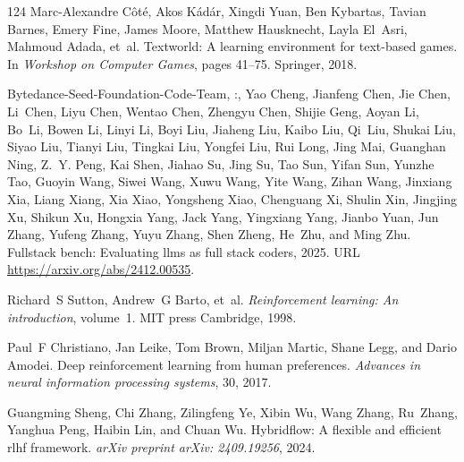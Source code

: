 \documentclass[]{youtu} %
\begin{document}
\begin{thebibliography}{124}
Marc-Alexandre C{\^o}t{\'e}, Akos K{\'a}d{\'a}r, Xingdi Yuan, Ben Kybartas, Tavian Barnes, Emery Fine, James Moore, Matthew Hausknecht, Layla El~Asri, Mahmoud Adada, et~al.
\newblock Textworld: A learning environment for text-based games.
\newblock In \emph{Workshop on Computer Games}, pages 41--75. Springer, 2018.

Bytedance-Seed-Foundation-Code-Team, :, Yao Cheng, Jianfeng Chen, Jie Chen, Li~Chen, Liyu Chen, Wentao Chen, Zhengyu Chen, Shijie Geng, Aoyan Li, Bo~Li, Bowen Li, Linyi Li, Boyi Liu, Jiaheng Liu, Kaibo Liu, Qi~Liu, Shukai Liu, Siyao Liu, Tianyi Liu, Tingkai Liu, Yongfei Liu, Rui Long, Jing Mai, Guanghan Ning, Z.~Y. Peng, Kai Shen, Jiahao Su, Jing Su, Tao Sun, Yifan Sun, Yunzhe Tao, Guoyin Wang, Siwei Wang, Xuwu Wang, Yite Wang, Zihan Wang, Jinxiang Xia, Liang Xiang, Xia Xiao, Yongsheng Xiao, Chenguang Xi, Shulin Xin, Jingjing Xu, Shikun Xu, Hongxia Yang, Jack Yang, Yingxiang Yang, Jianbo Yuan, Jun Zhang, Yufeng Zhang, Yuyu Zhang, Shen Zheng, He~Zhu, and Ming Zhu.
\newblock Fullstack bench: Evaluating llms as full stack coders, 2025.
\newblock URL \url{https://arxiv.org/abs/2412.00535}.

Richard~S Sutton, Andrew~G Barto, et~al.
\newblock \emph{Reinforcement learning: An introduction}, volume~1.
\newblock MIT press Cambridge, 1998.

Paul~F Christiano, Jan Leike, Tom Brown, Miljan Martic, Shane Legg, and Dario Amodei.
\newblock Deep reinforcement learning from human preferences.
\newblock \emph{Advances in neural information processing systems}, 30, 2017.

Guangming Sheng, Chi Zhang, Zilingfeng Ye, Xibin Wu, Wang Zhang, Ru~Zhang, Yanghua Peng, Haibin Lin, and Chuan Wu.
\newblock Hybridflow: A flexible and efficient rlhf framework.
\newblock \emph{arXiv preprint arXiv: 2409.19256}, 2024.


\end{thebibliography}
\end{document}
